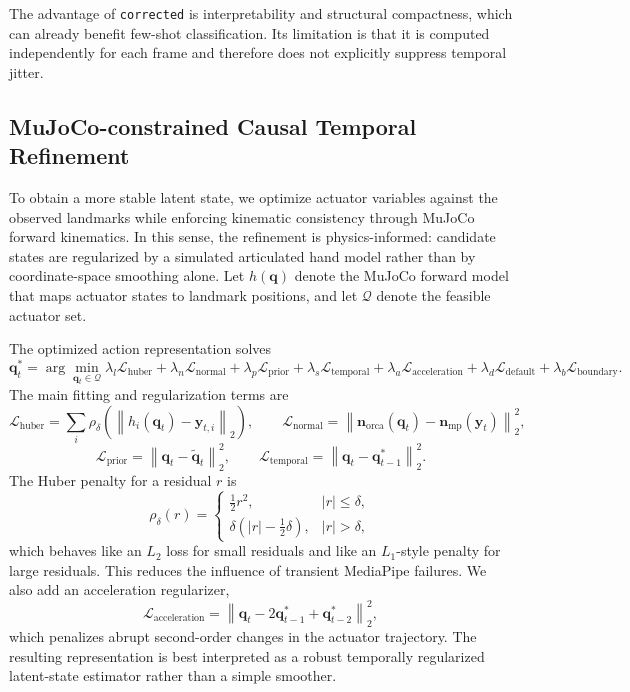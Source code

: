 \documentclass[11pt]{article}
\begin{document}
The advantage of \texttt{corrected} is interpretability and structural compactness, which can already benefit few-shot classification. Its limitation is that it is computed independently for each frame and therefore does not explicitly suppress temporal jitter.

\subsection{MuJoCo-constrained Causal Temporal Refinement}
To obtain a more stable latent state, we optimize actuator variables against the observed landmarks while enforcing kinematic consistency through MuJoCo forward kinematics. In this sense, the refinement is physics-informed: candidate states are regularized by a simulated articulated hand model rather than by coordinate-space smoothing alone. Let $h(\mathbf{q})$ denote the MuJoCo forward model that maps actuator states to landmark positions, and let $\mathcal{Q}$ denote the feasible actuator set.

The optimized action representation solves
\[
\mathbf{q}_t^*
=
\arg\min_{\mathbf{q}_t \in \mathcal{Q}}
\lambda_l \mathcal{L}_{\text{huber}}
+
\lambda_n \mathcal{L}_{\text{normal}}
+
\lambda_p \mathcal{L}_{\text{prior}}
+
\lambda_s \mathcal{L}_{\text{temporal}}
+
\lambda_a \mathcal{L}_{\text{acceleration}}
+
\lambda_d \mathcal{L}_{\text{default}}
+
\lambda_b \mathcal{L}_{\text{boundary}}.
\]
The main fitting and regularization terms are
\[
\mathcal{L}_{\text{huber}}
=
\sum_i \rho_\delta \!\left(\left\| h_i(\mathbf{q}_t) - \mathbf{y}_{t,i} \right\|_2\right),
\qquad
\mathcal{L}_{\text{normal}}
=
\left\| \mathbf{n}_{\text{orca}}(\mathbf{q}_t) - \mathbf{n}_{\text{mp}}(\mathbf{y}_t) \right\|_2^2,
\]
\[
\mathcal{L}_{\text{prior}}
=
\left\| \mathbf{q}_t - \tilde{\mathbf{q}}_t \right\|_2^2,
\qquad
\mathcal{L}_{\text{temporal}}
=
\left\| \mathbf{q}_t - \mathbf{q}_{t-1}^* \right\|_2^2.
\]
The Huber penalty for a residual $r$ is
\[
\rho_{\delta}(r)
=
\begin{cases}
\frac{1}{2} r^2, & |r| \le \delta, \\
\delta \left(|r| - \frac{1}{2}\delta\right), & |r| > \delta,
\end{cases}
\]
which behaves like an $L_2$ loss for small residuals and like an $L_1$-style penalty for large residuals. This reduces the influence of transient MediaPipe failures. We also add an acceleration regularizer,
\[
\mathcal{L}_{\text{acceleration}}
=
\left\| \mathbf{q}_t - 2\mathbf{q}_{t-1}^* + \mathbf{q}_{t-2}^* \right\|_2^2,
\]
which penalizes abrupt second-order changes in the actuator trajectory. The resulting representation is best interpreted as a robust temporally regularized latent-state estimator rather than a simple smoother.
\end{document}
